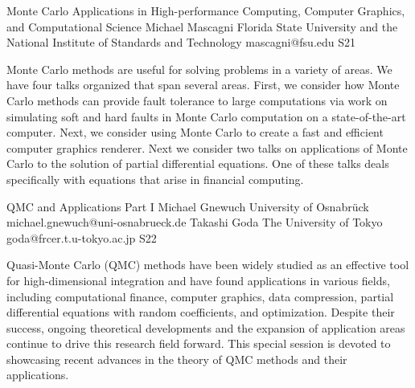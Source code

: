 

\clearpage

\begin{session}
 {Monte Carlo Applications in High-performance Computing, Computer Graphics, and Computational Science}%
 {Michael Mascagni}%
 {Florida State University and the National Institute of Standards and Technology}%
 {mascagni@fsu.edu}%
{}{}{}
 {S21}%
{}

 Monte Carlo methods are useful for solving problems in a variety of areas.  We have four talks organized that span several areas.  First,  we consider how Monte Carlo methods can provide fault tolerance to large computations via work on simulating soft and hard faults in Monte Carlo computation on a state-of-the-art computer.  Next, we consider using Monte Carlo to create a fast and efficient computer graphics renderer. Next we consider two talks on applications of Monte Carlo to the solution of partial differential equations.  One of these talks deals specifically with equations that arise in financial computing.
\end{session}



\clearpage

\begin{session}
 {QMC and Applications Part I}%
 {Michael Gnewuch}%
 {University of Osnabr\"uck}%
 {michael.gnewuch@uni-osnabrueck.de}%
 {Takashi Goda}%
 {The University of Tokyo}%
 {goda@frcer.t.u-tokyo.ac.jp}%
 {S22}%
 {}%

 Quasi-Monte Carlo (QMC) methods have been widely studied as an effective tool for high-dimensional integration and have found applications in various fields, including computational finance, computer graphics, data compression, partial differential equations with random coefficients, and %
 optimization.
 Despite their success, ongoing theoretical developments and the expansion of application areas continue to drive this research field forward. This special session is devoted to showcasing recent advances in the theory of QMC methods and their applications.
\end{session}

